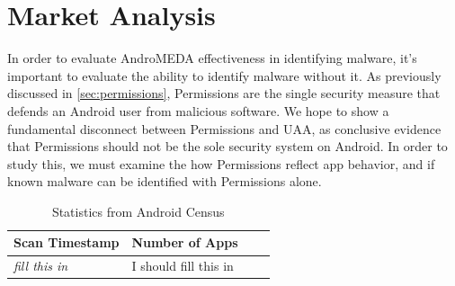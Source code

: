 \chapter{Market Analysis}
\label{sec:market}

In order to evaluate AndroMEDA effectiveness in identifying malware, it's important to evaluate the ability to identify malware without it. As previously discussed in \ref{sec:permissions}, Permissions are the single security measure that defends an Android user from malicious software. We hope to show a fundamental disconnect between Permissions and UAA, as conclusive evidence that Permissions should not be the sole security system on Android. In order to study this, we must examine the how Permissions reflect app behavior, and if known malware can be identified with Permissions alone.


\begin{table}[t]
\begin{small}
\begin{tabular}{l|lll}
Scan Timestamp & Number of Apps &  \\
\hline

\textit{fill this in} & I should fill this in  \\

\end{tabular}
\end{small}
\caption{Statistics from Android Census}
\label{tab:marketstats}
\end{table}


